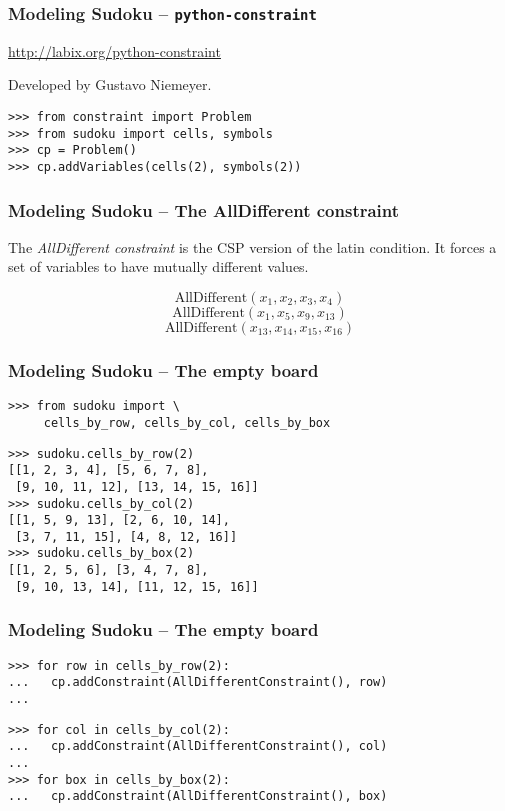 \documentclass{beamer}
\begin{document}
\begin{frame}[fragile]
\frametitle{Modeling Sudoku -- \texttt{python-constraint}}

\url{http://labix.org/python-constraint}

Developed by Gustavo Niemeyer.

\pause

\begin{lstlisting}
>>> from constraint import Problem
>>> from sudoku import cells, symbols
>>> cp = Problem()
>>> cp.addVariables(cells(2), symbols(2))
\end{lstlisting}

\end{frame}

\begin{frame}[fragile]
\frametitle{Modeling Sudoku -- The AllDifferent constraint}

The \emph{AllDifferent constraint} is the CSP version of the latin condition. It forces a set of variables to have mutually different values.

\pause

\[\mbox{AllDifferent}(x_{1}, x_{2}, x_{3}, x_{4})\]\pause
\[\mbox{AllDifferent}(x_{1}, x_{5}, x_{9}, x_{13})\]\pause
\[\mbox{AllDifferent}(x_{13}, x_{14}, x_{15}, x_{16})\]

\end{frame}

\begin{frame}[fragile]
\frametitle{Modeling Sudoku -- The empty board}

\begin{lstlisting}
>>> from sudoku import \
     cells_by_row, cells_by_col, cells_by_box
\end{lstlisting}

\pause

\begin{lstlisting}
>>> sudoku.cells_by_row(2)
[[1, 2, 3, 4], [5, 6, 7, 8],
 [9, 10, 11, 12], [13, 14, 15, 16]]
>>> sudoku.cells_by_col(2)
[[1, 5, 9, 13], [2, 6, 10, 14], 
 [3, 7, 11, 15], [4, 8, 12, 16]]
>>> sudoku.cells_by_box(2)
[[1, 2, 5, 6], [3, 4, 7, 8], 
 [9, 10, 13, 14], [11, 12, 15, 16]]
\end{lstlisting}

\end{frame}


\begin{frame}[fragile]
\frametitle{Modeling Sudoku -- The empty board}

\begin{lstlisting}
>>> for row in cells_by_row(2):
...   cp.addConstraint(AllDifferentConstraint(), row)
... 
\end{lstlisting}
\pause
\begin{lstlisting}
>>> for col in cells_by_col(2):
...   cp.addConstraint(AllDifferentConstraint(), col)
... 
>>> for box in cells_by_box(2):
...   cp.addConstraint(AllDifferentConstraint(), box)
\end{lstlisting}

\end{frame}
\end{document}
